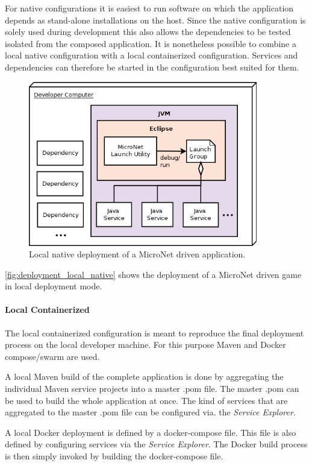 For native configurations it is easiest to run software on which the application
depends as stand-alone installations on the host. Since the native configuration
is solely used during development this also allows the dependencies to be tested
isolated from the composed application. It is nonetheless possible to combine a
local native configuration with a local containerized configuration. Services
and dependencies can therefore be started in the configuration best suited for
them.

\begin{figure}
	\centering
	\includegraphics[width=10cm]{images/architecture/DeploymentLocalNative}
	\caption{Local native deployment of a MicroNet driven application.}
	\label{fig:deployment_local_native}
\end{figure}

\autoref{fig:deployment_local_native} shows the deployment of a MicroNet
driven game in local deployment mode.

\paragraph{Local Containerized}

The local containerized configuration is meant to reproduce the final deployment
process on the local developer machine. For this purpose Maven and Docker
compose/swarm are used. 

A local Maven build of the complete application is done by aggregating the
individual Maven service projects into a master .pom file. The master .pom can
be used to build the whole application at once. The kind of services that are
aggregated to the master .pom file can be configured via. the \textit{Service Explorer}.

A local Docker deployment is defined by a docker-compose file. This file is also
defined by configuring services via the \textit{Service Explorer}. The Docker build
process is then simply invoked by building the docker-compose file.

